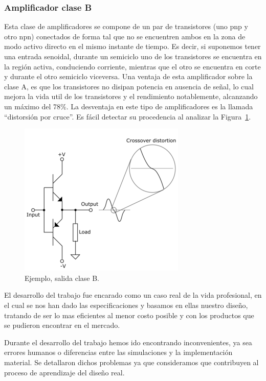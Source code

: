 \subsubsection*{Amplificador clase B}
\medskip 

Esta clase de amplificadores se compone de un par de transistores (uno pnp y otro npn) conectados de forma tal que no se encuentren ambos en la zona de modo activo directo en el mismo instante de tiempo. Es decir, si suponemos tener una entrada senoidal, durante un semiciclo uno de los transistores se encuentra en la región activa, conduciendo corriente, mientras que el otro se encuentra en corte y durante el otro semiciclo viceversa.
 Una ventaja de esta amplificador sobre la clase A, es que los transistores no disipan potencia en ausencia de señal, lo cual mejora la vida util de los transistores y el rendimiento notablemente, alcanzando un máximo del 78\%.
 La desventaja en este tipo de amplificadores es la llamada “distorsión por cruce”. Es fácil detectar su procedencia al analizar la Figura~\ref{ampliB}.

\begin{figure}[H]
\centering
\includegraphics[scale=0.8]{img/ampliB.png}
\caption{Ejemplo, salida clase B.}
\label{ampliB} 
\end{figure}




El desarrollo del trabajo fue encarado como un caso real de la vida profesional, en el cual se nos han dado las especificaciones y basamos en ellas nuestro diseño, tratando de ser lo mas eficientes al menor costo posible y con los productos que se pudieron encontrar en el mercado.
	
Durante el desarrollo del trabajo hemos ido encontrando inconvenientes, ya sea errores humanos o diferencias entre las simulaciones y la implementación material. Se detallaron dichos problemas ya que consideramos que contribuyen al proceso de aprendizaje del diseño real.